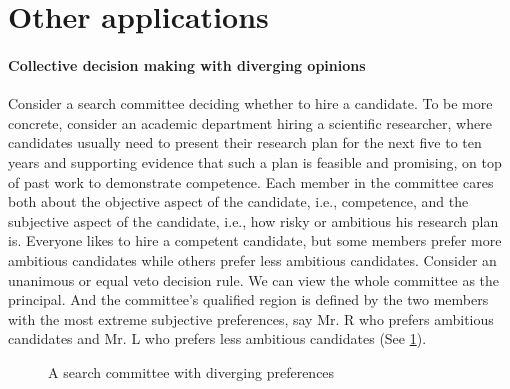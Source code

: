 \section{Other applications}\label{sec:applications}
\paragraph{Collective decision making with diverging opinions}

Consider a search committee deciding whether to hire a candidate.
To be more concrete, consider an academic department hiring a scientific researcher, where candidates usually need to present their research plan for the next five to ten years and supporting evidence that such a plan is feasible and promising, on top of past work to demonstrate competence. 
Each member in the committee cares both about the objective aspect of the candidate, i.e., competence, and the subjective aspect of the candidate, i.e., how risky or ambitious his research plan is.
Everyone likes to hire a competent candidate, but some members prefer more ambitious candidates while others prefer less ambitious candidates.
Consider an unanimous or equal veto decision rule. 
We can view the whole committee as the principal.
And the committee's qualified region is defined by the two members with the most extreme subjective preferences, say Mr. R who prefers ambitious candidates and Mr. L who prefers less ambitious candidates (See \cref{fig: search committee}).

\begin{figure}[h] 
\centering 
{}
\caption{A search committee with diverging preferences}
\label{fig: search committee}
  \end{figure}
  
